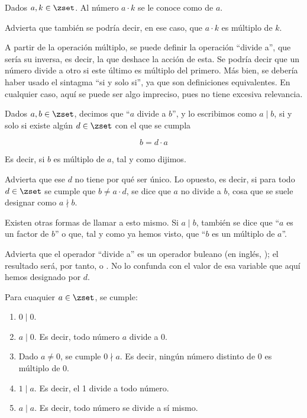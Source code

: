 


\begin{deffinition}[Múltiplo]\label{def-multiplo}
  Dados $a, k \in \zset$. Al número $a \cdot k$ se le conoce como
   de $a$.
\end{deffinition}

Advierta que también se podría decir, en ese caso, que $a \cdot k$ es
múltiplo de $k$.

A partir de la operación múltiplo, se puede definir la operación ``divide a'',
que sería su inversa, es decir, la que deshace la acción de esta. Se podría
decir que un número divide a otro si este último es múltiplo del primero. Más
bien, se debería haber usado el sintagma ``si y solo si'', ya que son
definiciones equivalentes. En cualquier caso, aquí se puede ser algo impreciso,
pues no tiene excesiva relevancia.

\begin{deffinition}
  Dados $a, b \in \zset$, decimos que ``$a$ divide a $b$'', y lo escribimos
  como $a \mid b$, si y solo si existe algún $d \in \zset$ con el que se
  cumpla

  $$ b = d \cdot a $$
\end{deffinition}

\noindent Es decir, si $b$ es múltiplo de $a$, tal y como dijimos.

Advierta que ese $d$ no tiene por qué ser único. Lo opuesto, es decir, si
para todo $d \in \zset$ se cumple que $b \neq a \cdot d$, se dice que $a$ no
divide a $b$, cosa que se suele designar como $a \nmid b$.

Existen otras formas de llamar a esto mismo. Si $a \mid b$, también se dice
que ``$a$ es un factor de $b$'' o que, tal y como ya hemos visto, que ``$b$
es un múltiplo de $a$''.

Advierta que el operador ``divide a'' es un operador buleano (en inglés,
); el resultado será, por tanto,  o . No
lo confunda con el valor de esa variable que aquí hemos designado por $d$.

\begin{properties}\label{propi-divide-1}
  Para cuaquier $a \in \zset$, se cumple:

  \begin{enumerate}
    \item $0 \mid 0$.
    \item $a \mid 0$. Es decir, todo número $a$ divide a 0.
    \item Dado $a \neq 0$, se cumple $0 \nmid a$. Es decir, ningún número
      distinto de 0 es múltiplo de 0.
    \item $1 \mid a$. Es decir, el 1 divide a todo número.
    \item $a \mid a$. Es decir, todo número se divide a sí mismo.
  \end{enumerate}
\end{properties}

